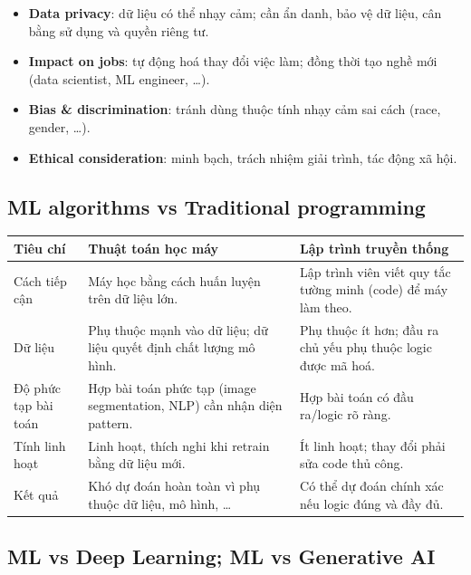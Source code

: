 \begin{phuongphap}[title={Challenges in Machine Learning}]
\begin{itemize}
  \item \textbf{Data privacy}: dữ liệu có thể nhạy cảm; cần ẩn danh, bảo vệ dữ liệu, cân bằng sử dụng và quyền riêng tư.
  \item \textbf{Impact on jobs}: tự động hoá thay đổi việc làm; đồng thời tạo nghề mới (data scientist, ML engineer, \ldots).
  \item \textbf{Bias \& discrimination}: tránh dùng thuộc tính nhạy cảm sai cách (race, gender, \ldots).
  \item \textbf{Ethical consideration}: minh bạch, trách nhiệm giải trình, tác động xã hội.
\end{itemize}
\end{phuongphap}

\subsection{ML algorithms vs Traditional programming}

\begin{vidu}[title={So sánh theo tiêu chí}]
\begin{tabularx}{\linewidth}{>{\raggedright\arraybackslash}p{3.2cm}XX}
\textbf{Tiêu chí} & \textbf{Thuật toán học máy} & \textbf{Lập trình truyền thống} \\
\midrule
Cách tiếp cận & Máy học bằng cách huấn luyện trên dữ liệu lớn. & Lập trình viên viết quy tắc tường minh (code) để máy làm theo. \\
Dữ liệu & Phụ thuộc mạnh vào dữ liệu; dữ liệu quyết định chất lượng mô hình. & Phụ thuộc ít hơn; đầu ra chủ yếu phụ thuộc logic được mã hoá. \\
Độ phức tạp bài toán & Hợp bài toán phức tạp (image segmentation, NLP) cần nhận diện pattern. & Hợp bài toán có đầu ra/logic rõ ràng. \\
Tính linh hoạt & Linh hoạt, thích nghi khi retrain bằng dữ liệu mới. & Ít linh hoạt; thay đổi phải sửa code thủ công. \\
Kết quả & Khó dự đoán hoàn toàn vì phụ thuộc dữ liệu, mô hình, \ldots & Có thể dự đoán chính xác nếu logic đúng và đầy đủ. \\
\end{tabularx}
\end{vidu}

\subsection{ML vs Deep Learning; ML vs Generative AI}

